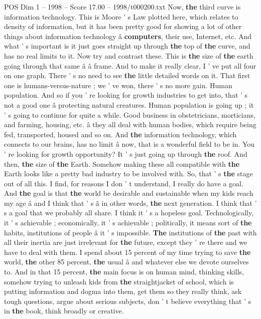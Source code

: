 \begin{textsample}{POS Dim 1 – 1998 – Score 17.00 – 1998/t000200.txt}
Now, \textbf{the} third curve is information technology.
This is Moore ' s Law plotted here, which relates to density of information, but it has been pretty good for showing a lot of other things about information technology â \textbf{computers}, their use, Internet, etc.
And what ' s important is it just goes straight up through \textbf{the} top of \textbf{the} curve, and has no real limits to it.
Now try and contrast these.
This is \textbf{the} size of \textbf{the} earth going through that same â â frame.
And to make it really clear, I ' ve put all four on one graph.
There ' s no need to see \textbf{the} little detailed words on it.
That first one is humans-versus-nature ; we ' ve won, there ' s no more gain.
Human population.
And so if you ' re looking for growth industries to get into, that ' s not a good one â protecting natural creatures.
Human population is going up ; it ' s going to continue for quite a while.
Good business in obstetricians, morticians, and farming, housing, etc. â they all deal with human bodies, which require being fed, transported, housed and so on.
And \textbf{the} information technology, which connects to our brains, has no limit â now, that is a wonderful field to be in.
You ' re looking for growth opportunity?
It ' s just going up through \textbf{the} roof.
And then, \textbf{the} size of \textbf{the} Earth.
Somehow making these all compatible with \textbf{the} Earth looks like a pretty bad industry to be involved with.
So, that ' s \textbf{the} stage out of all this.
I find, for reasons I don ' t understand, I really do have a goal.
And \textbf{the} goal is that \textbf{the} world be desirable and sustainable when my kids reach my age â and I think that ' s â in other words, \textbf{the} next generation.
I think that ' s a goal that we probably all share.
I think it ' s a hopeless goal.
Technologically, it ' s achievable ; economically, it ' s achievable ; politically, it means sort of \textbf{the} habits, institutions of people â it ' s impossible. \textbf{The} institutions of \textbf{the} past with all their inertia are just irrelevant for \textbf{the} future, except they ' re there and we have to deal with them.
I spend about 15 percent of my time trying to save \textbf{the} world, \textbf{the} other 85 percent, \textbf{the} usual â and whatever else we devote ourselves to.
And in that 15 percent, \textbf{the} main focus is on human mind, thinking skills, somehow trying to unleash kids from \textbf{the} straightjacket of school, which is putting information and dogma into them, get them so they really think, ask tough questions, argue about serious subjects, don ' t believe everything that ' s in \textbf{the} book, think broadly or creative.

\end{textsample}
